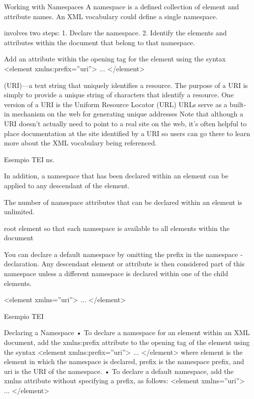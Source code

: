 Working with Namespaces
A namespace is a defined collection of element and attribute names.
An XML vocabulary could define a single namespace.

involves two steps:
1. Declare the namespace.
2. Identify the elements and attributes within the document that belong to that
namespace.

Add an attribute
within the opening tag for the element using the syntax
<element xmlns:prefix=”uri”> ... </element>

(URI)—a text string that uniquely identifies a resource.
The purpose of a URI is simply to provide a
unique string of characters that identify a resource.
One version of a URI is the Uniform Resource Locator (URL)
URLs serve as a built-in mechanism on the web for generating unique addresses
Note that although a URI
doesn’t actually need to point to a real site on the web, it’s often helpful to place
documentation at the site identified by a URI so users can go there to learn more
about the XML vocabulary being referenced.

Esempio TEI ns.

In addition, a namespace that has been declared within an element can
be applied to any descendant of the element.

The number of namespace attributes that can be declared within an element is
unlimited.

root element so that each namespace is available to all
elements within the document

You can declare a default namespace by omitting the prefix in the namespace ­declaration.
Any descendant element or attribute is then considered part of this namespace unless a
different namespace is declared within one of the child elements.


<element xmlns=”uri”> ... </element>

Esempio TEI


Declaring a Namespace
• To declare a namespace for an element within an XML document, add the
xmlns:prefix attribute to the opening tag of the element using the syntax
<element xmlns:prefix=”uri”> ... </element>
where element is the element in which the namespace is declared, prefix is the
namespace prefix, and uri is the URI of the namespace.
• To declare a default namespace, add the xmlns attribute without specifying a prefix,
as follows:
<element xmlns=”uri”> ... </element>



